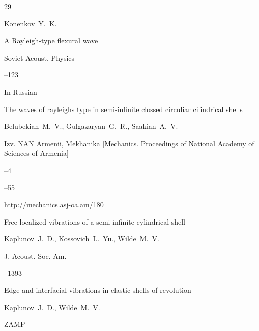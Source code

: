\begin{thebibliography}{29}




\by  Konenkov~Y.~K.


\paper A Rayleigh-type flexural wave

\jour Soviet Acoust. Physics 



–123




\lang In Russian

\paper The waves of rayleighs type in semi-infinite clossed circuliar cilindrical shells

\by  Belubekian~M.~V., Gulgazaryan~G.~R., Saakian~A.~V.

\jour Izv. NAN Armenii, Mekhanika \rm [Mechanics. Proceedings of National Academy of Sciences of Armenia]



--4

--55

\elink \url{http://mechanics.asj-oa.am/180}






\paper Free localized vibrations of a semi-infinite cylindrical shell

\by Kaplunov~J.~D., Kossovich~L.~Yu., Wilde~M.~V.

\jour J. Acoust. Soc. Am.




--1393





\paper Edge and interfacial vibrations in elastic shells of revolution

\by Kaplunov~J.~D., Wilde~M.~V.

\jour ZAMP




\end{thebibliography}
